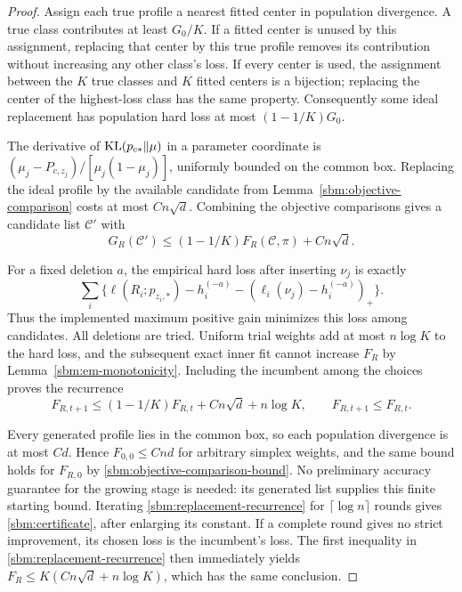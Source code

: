 \begin{proof}
Assign each true profile a nearest fitted center in population
divergence. A true class contributes at least $G_0/K$. If a fitted
center is unused by this assignment, replacing that center by this
true profile removes its contribution without increasing any other
class's loss. If every center is used, the assignment between the
$K$ true classes and $K$ fitted centers is a bijection; replacing the
center of the highest-loss class has the same property. Consequently
some ideal replacement has population hard loss at most
$(1-1/K)G_0$.

The derivative of $\operatorname{KL}(p_{c*}\Vert\mu)$ in a parameter coordinate is
$(\mu_j-P_{c,z_j})/[\mu_j(1-\mu_j)]$, uniformly bounded on the common
box. Replacing the ideal profile by the available candidate from
Lemma~\ref{sbm:objective-comparison} costs at most $Cn\sqrt d$.
Combining the objective comparisons gives a candidate list $\mathcal C'$
with
\[
 G_R(\mathcal C')\le(1-1/K)F_R(\mathcal C,\pi)+Cn\sqrt d.
\]

For a fixed deletion $a$, the empirical hard loss after inserting
$\nu_j$ is exactly
\[
 \sum_i\{\ell(R_i;p_{z_i,*})-h_i^{(-a)}
                         -(\ell_i(\nu_j)-h_i^{(-a)})_+\}.
\]
Thus the implemented maximum positive gain minimizes this loss among
candidates. All deletions are tried. Uniform trial weights add at most
$n\log K$ to the hard loss, and the subsequent exact inner fit cannot
increase $F_R$ by Lemma~\ref{sbm:em-monotonicity}. Including the
incumbent among the choices proves the recurrence
\begin{equation}
 F_{R,t+1}\le(1-1/K)F_{R,t}+Cn\sqrt d+n\log K,
 \qquad F_{R,t+1}\le F_{R,t}.
 \label{sbm:replacement-recurrence}
\end{equation}

Every generated profile lies in the common box, so each population
divergence is at most $Cd$. Hence $F_{0,0}\le Cnd$ for arbitrary
simplex weights, and the same bound holds for $F_{R,0}$ by
\eqref{sbm:objective-comparison-bound}. No preliminary accuracy guarantee
for the growing stage is needed: its generated list supplies this finite
starting bound. Iterating
\eqref{sbm:replacement-recurrence} for $\lceil\log n\rceil$ rounds
gives \eqref{sbm:certificate}, after enlarging its constant. If a
complete round gives no strict improvement, its chosen loss is the
incumbent's loss. The first inequality in
\eqref{sbm:replacement-recurrence} then immediately yields
$F_R\le K(Cn\sqrt d+n\log K)$, which has the same conclusion.
\end{proof}

